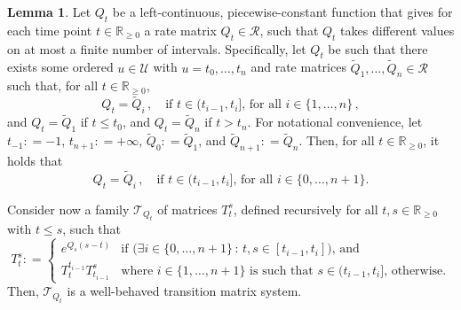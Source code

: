\documentclass[10pt]{paper}
\theoremstyle{definition}
\newtheorem{lemma}[theorem]{Lemma}
\newcommand{\reals}{\mathbb{R}}
\newcommand{\realsnonneg}{\reals_{\geq 0}}
\newcommand{\coloneqq}{:\!=}
\begin{document}
\begin{lemma}\label{lemma:nonhomogen_trans_mat_system}
Let $Q_t$ be a left-continuous, piecewise-constant function that gives for each time point $t\in\realsnonneg$ a rate matrix $Q_t\in\mathcal{R}$, such that $Q_t$ takes different values on at most a finite number of intervals. Specifically, let $Q_t$ be such that there exists some ordered $u\in\mathcal{U}$ with $u=t_0,\ldots,t_n$ and rate matrices $\tilde{Q}_1,\ldots,\tilde{Q}_n\in\mathcal{R}$ such that, for all $t\in\realsnonneg$,
\begin{equation*}
Q_t = \tilde{Q}_i\,,\quad\text{if $t\in(t_{i-1},t_{i}]$, for all $i\in\{1,\ldots,n\}$}\,,
\end{equation*}
and $Q_t=\tilde{Q}_1$ if $t\leq t_0$, and $Q_t=\tilde{Q}_n$ if $t>t_n$. For notational convenience, let $t_{-1}\coloneqq-1$, $t_{n+1}\coloneqq +\infty$, $\tilde{Q}_0\coloneqq \tilde{Q}_1$, and $\tilde{Q}_{n+1}\coloneqq \tilde{Q}_n$. Then, for all $t\in\realsnonneg$, it holds that
\begin{equation*}
Q_t = \tilde{Q}_i\,,\quad\text{if $t\in(t_{i-1},t_i]$, for all $i\in\{0,\ldots,n+1\}$.}
\end{equation*}

Consider now a family $\mathcal{T}_{Q_t}$ of matrices $T_t^s$, defined recursively for all $t,s\in\realsnonneg$ with $t\leq s$, such that
\begin{equation*}
T_t^s \coloneqq \left\{\begin{array}{ll}
e^{Q_s(s-t)} & \text{if $\bigl(\exists i\in\{0,\ldots,n+1\}\,:\,t,s\in[t_{i-1},t_i]\bigr)$, and} \\
T_t^{t_{i-1}}T_{t_{i-1}}^s & \text{where $i\in\{1,\ldots,n+1\}$ is such that $s\in(t_{i-1},t_i]$, otherwise.}
\end{array}\right.
\end{equation*}
Then, $\mathcal{T}_{Q_t}$ is a well-behaved transition matrix system.
\end{lemma}
\end{document}
